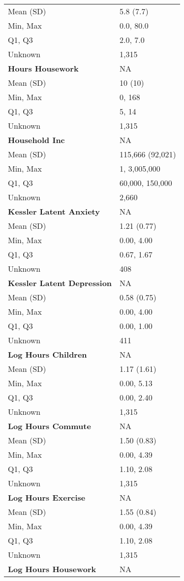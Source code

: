 \documentclass[
  single column]{article}
\begin{document}
\begin{longtable}[]{@{}ll@{}}
Mean (SD) & 5.8 (7.7) \\
Min, Max & 0.0, 80.0 \\
Q1, Q3 & 2.0, 7.0 \\
Unknown & 1,315 \\
\textbf{Hours Housework} & NA \\
Mean (SD) & 10 (10) \\
Min, Max & 0, 168 \\
Q1, Q3 & 5, 14 \\
Unknown & 1,315 \\
\textbf{Household Inc} & NA \\
Mean (SD) & 115,666 (92,021) \\
Min, Max & 1, 3,005,000 \\
Q1, Q3 & 60,000, 150,000 \\
Unknown & 2,660 \\
\textbf{Kessler Latent Anxiety} & NA \\
Mean (SD) & 1.21 (0.77) \\
Min, Max & 0.00, 4.00 \\
Q1, Q3 & 0.67, 1.67 \\
Unknown & 408 \\
\textbf{Kessler Latent Depression} & NA \\
Mean (SD) & 0.58 (0.75) \\
Min, Max & 0.00, 4.00 \\
Q1, Q3 & 0.00, 1.00 \\
Unknown & 411 \\
\textbf{Log Hours Children} & NA \\
Mean (SD) & 1.17 (1.61) \\
Min, Max & 0.00, 5.13 \\
Q1, Q3 & 0.00, 2.40 \\
Unknown & 1,315 \\
\textbf{Log Hours Commute} & NA \\
Mean (SD) & 1.50 (0.83) \\
Min, Max & 0.00, 4.39 \\
Q1, Q3 & 1.10, 2.08 \\
Unknown & 1,315 \\
\textbf{Log Hours Exercise} & NA \\
Mean (SD) & 1.55 (0.84) \\
Min, Max & 0.00, 4.39 \\
Q1, Q3 & 1.10, 2.08 \\
Unknown & 1,315 \\
\textbf{Log Hours Housework} & NA \\

\end{longtable}
\end{document}
